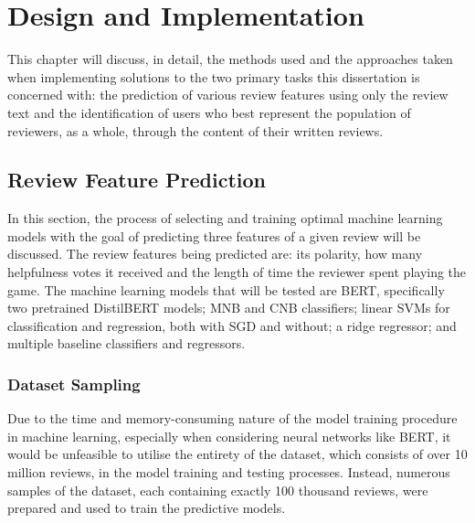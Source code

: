 \chapter{Design and Implementation} \label{sec:DI}

This chapter will discuss, in detail, the methods used and the approaches taken when implementing solutions to the two primary tasks this dissertation is concerned with: the prediction of various review features using only the review text and the identification of users who best represent the population of reviewers, as a whole, through the content of their written reviews.

\section{Review Feature Prediction} \label{sec:DI_RF}

In this section, the process of selecting and training optimal machine learning models with the goal of predicting three features of a given review will be discussed. The review features being predicted are: its polarity, how many helpfulness votes it received and the length of time the reviewer spent playing the game. The machine learning models that will be tested are BERT, specifically two pretrained DistilBERT models; MNB and CNB classifiers; linear SVMs for classification and regression, both with SGD and without; a ridge regressor; and multiple baseline classifiers and regressors.

\subsection{Dataset Sampling} \label{sec:DI_RF_Sampling}

Due to the time and memory-consuming nature of the model training procedure in machine learning, especially when considering neural networks like BERT, it would be unfeasible to utilise the entirety of the dataset, which consists of over 10 million reviews, in the model training and testing processes. Instead, numerous samples of the dataset, each containing exactly 100 thousand reviews, were prepared and used to train the predictive models.

